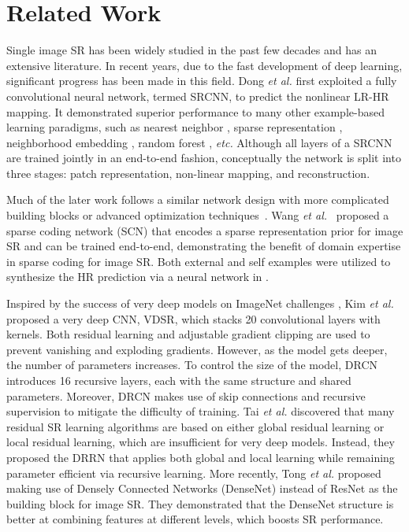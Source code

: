 \documentclass[10pt,twocolumn,letterpaper]{article}
\begin{document}
%
 

\section{Related Work}
Single image SR has been widely studied in the past few decades and has an extensive literature.
In recent years, due to the fast development of deep learning, significant progress has been made in this field.  Dong \emph{et al.} \cite{dong2014learning} first exploited a fully convolutional neural network, termed SRCNN, to predict the nonlinear LR-HR mapping.  It demonstrated superior performance to many other example-based learning paradigms, such as nearest neighbor \cite{freeman2002example}, sparse representation \cite{yang2010image,yang2012coupled}, neighborhood embedding \cite{chang2004super, timofte2014a+}, random forest \cite{schulter2015fast}, \emph{etc.}   
Although all layers of a SRCNN are trained jointly in an end-to-end fashion, conceptually the network is split into three stages: patch representation, non-linear mapping, and reconstruction.  

Much of the later work follows a similar network design with more complicated building blocks or advanced optimization techniques~\cite{shi2016real,liu2016robust,dong2016accelerating,liu2016learning}.  
Wang \emph{et al.}\ \cite{wang2015deep} proposed
a sparse coding network (SCN) that encodes a sparse representation prior for image SR and can be trained end-to-end, demonstrating the benefit of domain expertise in sparse coding for image SR. 
Both external and self examples were utilized to synthesize the HR prediction via a neural network in \cite{wang2015self}. 

Inspired by the success of very deep models \cite{he2016deep} on ImageNet challenges \cite{deng2009imagenet}, Kim \emph{et al.} \cite{kim2016accurate} proposed a very deep CNN, VDSR, which stacks 20 convolutional layers with  kernels.  Both residual learning and adjustable gradient clipping are used to prevent vanishing and exploding gradients.  However, as the model gets deeper, the number of parameters increases.  To control the size of the model, DRCN introduces 16 recursive layers, each with the same structure and shared parameters.  Moreover, DRCN makes use of skip connections and recursive supervision to mitigate the difficulty of training.  Tai \emph{et al.} \cite{tai2017image} discovered that many residual SR learning algorithms are based on either global residual learning or local residual learning, which are insufficient for very deep models.  Instead, they proposed the DRRN that applies both global and local learning while remaining parameter efficient via recursive learning.  More recently,  Tong \emph{et al.} \cite{tong2017image} proposed making use of Densely Connected Networks (DenseNet) \cite{huang2016densely} instead of ResNet as the building block for image SR.  They demonstrated that the DenseNet structure is better at combining features at different levels, which boosts SR performance.  
\end{document}
